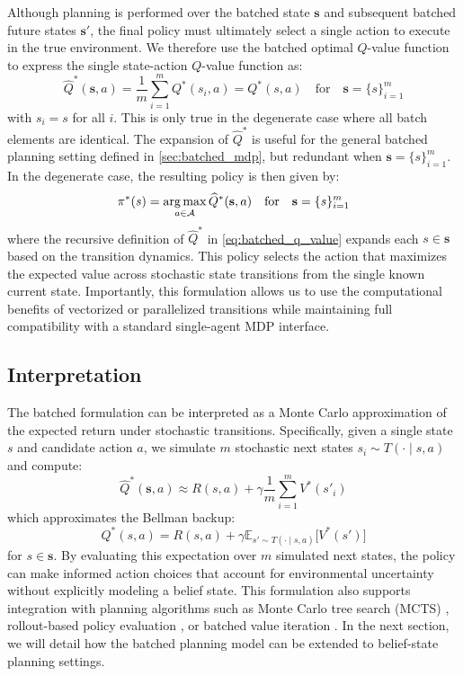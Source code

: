 Although planning is performed over the batched state $\mathbf{s}$ and subsequent batched future states $\mathbf{s}'$, the final policy must ultimately select a single action to execute in the true environment.
We therefore use the batched optimal $Q$-value function to express the single state-action $Q$-value function as:
\begin{equation}
    \widehat{Q}^*(\mathbf{s}, a) = \frac{1}{m} \sum_{i=1}^m Q^*(s_i, a) = Q^*(s, a) \quad \text{for} \quad \mathbf{s} = \{s\}_{i=1}^m
\end{equation}
with $s_i = s$ for all $i$.
This is only true in the degenerate case where all batch elements are identical.
The expansion of $\widehat{Q}^*$ is useful for the general batched planning setting defined in \cref{sec:batched_mdp}, but redundant when $\mathbf{s} = \{s\}_{i=1}^m$.
In the degenerate case, the resulting policy is then given by:
\begin{equation}
    \pi^*(s) = \argmax_{a \in \mathcal{A}} \widehat{Q}^*(\mathbf{s}, a) \quad \text{for} \quad \mathbf{s} = \{s\}_{i=1}^m
\end{equation}
where the recursive definition of $\widehat{Q}^*$ in \cref{eq:batched_q_value} expands each $s \in \mathbf{s}$ based on the transition dynamics.
This policy selects the action that maximizes the expected value across stochastic state transitions from the single known current state.
Importantly, this formulation allows us to use the computational benefits of vectorized or parallelized transitions while maintaining full compatibility with a standard single-agent MDP interface.

\subsection{Interpretation}

The batched formulation can be interpreted as a Monte Carlo approximation of the expected return under stochastic transitions.
Specifically, given a single state $s$ and candidate action $a$, we simulate $m$ stochastic next states $s_i \sim T(\cdot \mid s, a)$ and compute:
\begin{equation}
    \widehat{Q}^*(\mathbf{s}, a) \approx R(s, a) + \gamma \frac{1}{m} \sum_{i=1}^m V^*(s'_i)
\end{equation}
which approximates the Bellman backup:
\begin{equation}
    Q^*(s, a) = R(s, a) + \gamma \mathbb{E}_{s' \sim T(\cdot \mid s, a)} \big[ V^*(s') \big]
\end{equation}
for $s \in \mathbf{s}$.
By evaluating this expectation over $m$ simulated next states, the policy can make informed action choices that account for environmental uncertainty without explicitly modeling a belief state.
This formulation also supports integration with planning algorithms such as Monte Carlo tree search (MCTS) \cite{grill2020monte,cazenave2022batch}, rollout-based policy evaluation \cite{bertsekas2021rollout}, or batched value iteration \cite{ernst2005tree}.
In the next section, we will detail how the batched planning model can be extended to belief-state planning settings.


